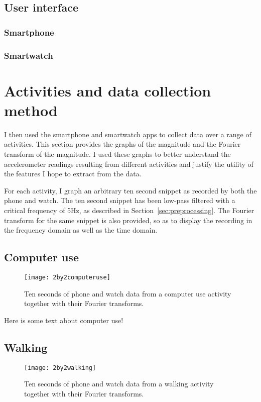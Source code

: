     \subsection{User interface}
      \subsubsection{Smartphone}
      
      \subsubsection{Smartwatch}
      
  \section{Activities and data collection method}
    I then used the smartphone and smartwatch apps to collect data over a range of activities. This section provides the graphs of the magnitude and the Fourier transform of the magnitude. I used these graphs to better understand the accelerometer readings resulting from different activities and justify the utility of the features I hope to extract from the data.
    
    For each activity, I graph an arbitrary ten second snippet as recorded by both the phone and watch. The ten second snippet has been low-pass filtered with a critical frequency of 5Hz, as described in Section~\ref{sec:preprocessing}. The Fourier transform for the same snippet is also provided, so as to display the recording in the frequency domain as well as the time domain. 
    \subsection{Computer use}
      \begin{figure}[!ht]
        \centering
        \texttt{[image: 2by2computeruse]}
        \caption{Ten seconds of phone and watch data from a computer use activity together with their Fourier transforms.}
        \label{fig:2by2computeruse}
      \end{figure}
      
      Here is some text about computer use!
    \subsection{Walking}
      \begin{figure}
        \centering
        \texttt{[image: 2by2walking]}
        \caption{Ten seconds of phone and watch data from a walking activity together with their Fourier transforms.}
        \label{fig:2by2walking}
      \end{figure}
